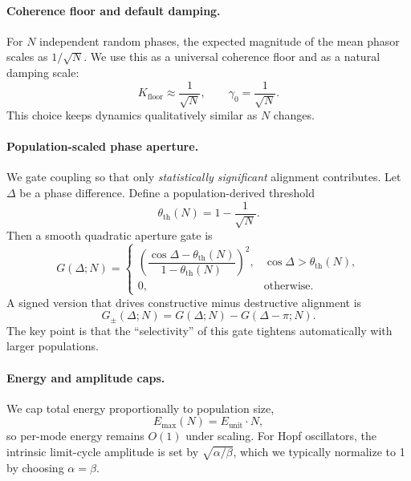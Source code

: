 \documentclass[11pt,a4paper]{article}
\newcommand{\damp}{\gamma}
\begin{document}
\paragraph{Coherence floor and default damping.}
For $N$ independent random phases, the expected magnitude of the mean phasor scales as $1/\sqrt{N}$. We use this as a universal coherence floor and as a natural damping scale:
\begin{equation}
K_{\mathrm{floor}} \approx \frac{1}{\sqrt{N}},
\qquad
\damp_0 = \frac{1}{\sqrt{N}}.
\label{eq:gamma_floor}
\end{equation}
This choice keeps dynamics qualitatively similar as $N$ changes.

\paragraph{Population-scaled phase aperture.}
We gate coupling so that only \emph{statistically significant} alignment contributes. Let $\Delta$ be a phase difference. Define a population-derived threshold
\begin{equation}
\theta_{\mathrm{th}}(N) = 1 - \frac{1}{\sqrt{N}}.
\end{equation}
Then a smooth quadratic aperture gate is
\begin{equation}
G(\Delta;N)=
\begin{cases}
\left(\dfrac{\cos\Delta-\theta_{\mathrm{th}}(N)}{1-\theta_{\mathrm{th}}(N)}\right)^{2},& \cos\Delta>\theta_{\mathrm{th}}(N),\\[0.6em]
0,&\text{otherwise.}
\end{cases}
\label{eq:phase_aperture}
\end{equation}
A signed version that drives constructive minus destructive alignment is
\begin{equation}
G_{\pm}(\Delta;N)=G(\Delta;N)-G(\Delta-\pi;N).
\end{equation}
The key point is that the ``selectivity'' of this gate tightens automatically with larger populations.

\paragraph{Energy and amplitude caps.}
We cap total energy proportionally to population size,
\begin{equation}
E_{\max}(N)=E_{\mathrm{unit}}\cdot N,
\end{equation}
so per-mode energy remains $O(1)$ under scaling. For Hopf oscillators, the intrinsic limit-cycle amplitude is set by $\sqrt{\alpha/\beta}$, which we typically normalize to 1 by choosing $\alpha=\beta$.
\end{document}
